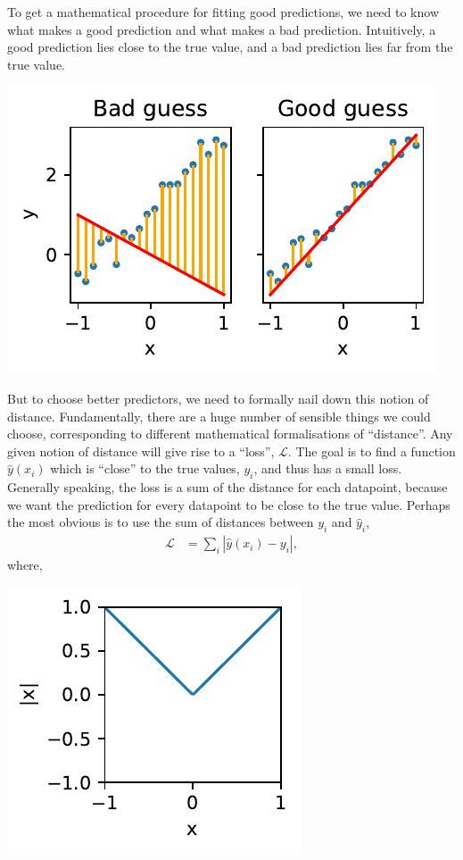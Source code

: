 \documentclass{article}
\newcommand{\yh}{\hat{y}}
\newcommand{\bracket}[3]{\left#1 #3 \right#2}
\newcommand{\abs}{\bracket{\lvert}{\rvert}}
\renewcommand{\L}{\mathcal{L}}
\begin{document}
To get a mathematical procedure for fitting good predictions, we need to know what makes a good prediction and what makes a bad prediction.
Intuitively, a good prediction lies close to the true value, and a bad prediction lies far from the true value.
\begin{center}
  \includegraphics{good_bad.pdf}
\end{center}
But to choose better predictors, we need to formally nail down this notion of distance.
Fundamentally, there are a huge number of sensible things we could choose, corresponding to different mathematical formalisations of ``distance''.
Any given notion of distance will give rise to a ``loss'', $\L$. 
The goal is to find a function $\yh(x_i)$ which is ``close'' to the true values, $y_i$, and thus has a small loss.
Generally speaking, the loss is a sum of the distance for each datapoint, because we want the prediction for every datapoint to be close to the true value.
Perhaps the most obvious is to use the sum of distances between $y_i$ and $\yh_i$,
\begin{align}
  \L &= \sum_i \abs{\yh(x_i) - y_i},
\end{align}
where,
\begin{center}
  \includegraphics{abs.pdf}
\end{center}
\end{document}

